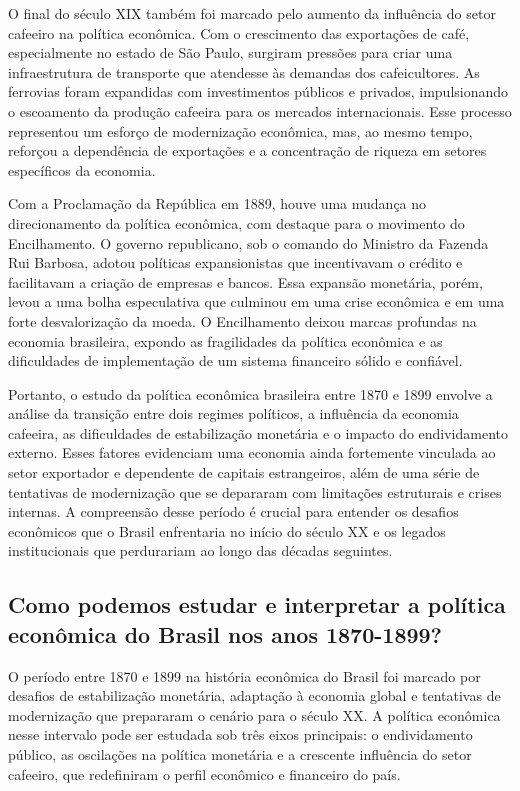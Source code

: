 \documentclass[a4paper,12pt]{article}[abntex2]
\begin{document}
O final do século XIX também foi marcado pelo aumento da influência do setor cafeeiro na política econômica. Com o crescimento das exportações de café, especialmente no estado de São Paulo, surgiram pressões para criar uma infraestrutura de transporte que atendesse às demandas dos cafeicultores. As ferrovias foram expandidas com investimentos públicos e privados, impulsionando o escoamento da produção cafeeira para os mercados internacionais. Esse processo representou um esforço de modernização econômica, mas, ao mesmo tempo, reforçou a dependência de exportações e a concentração de riqueza em setores específicos da economia.

Com a Proclamação da República em 1889, houve uma mudança no direcionamento da política econômica, com destaque para o movimento do Encilhamento. O governo republicano, sob o comando do Ministro da Fazenda Rui Barbosa, adotou políticas expansionistas que incentivavam o crédito e facilitavam a criação de empresas e bancos. Essa expansão monetária, porém, levou a uma bolha especulativa que culminou em uma crise econômica e em uma forte desvalorização da moeda. O Encilhamento deixou marcas profundas na economia brasileira, expondo as fragilidades da política econômica e as dificuldades de implementação de um sistema financeiro sólido e confiável.

Portanto, o estudo da política econômica brasileira entre 1870 e 1899 envolve a análise da transição entre dois regimes políticos, a influência da economia cafeeira, as dificuldades de estabilização monetária e o impacto do endividamento externo. Esses fatores evidenciam uma economia ainda fortemente vinculada ao setor exportador e dependente de capitais estrangeiros, além de uma série de tentativas de modernização que se depararam com limitações estruturais e crises internas. A compreensão desse período é crucial para entender os desafios econômicos que o Brasil enfrentaria no início do século XX e os legados institucionais que perdurariam ao longo das décadas seguintes.

\subsection{\textbf{Como podemos estudar e interpretar a política econômica do Brasil nos anos 1870-1899?}}

O período entre 1870 e 1899 na história econômica do Brasil foi marcado por desafios de estabilização monetária, adaptação à economia global e tentativas de modernização que prepararam o cenário para o século XX. A política econômica nesse intervalo pode ser estudada sob três eixos principais: o endividamento público, as oscilações na política monetária e a crescente influência do setor cafeeiro, que redefiniram o perfil econômico e financeiro do país.
\end{document}
